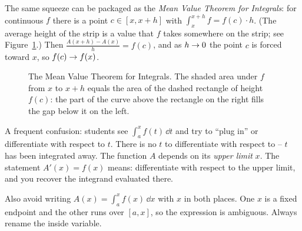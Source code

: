 \begin{remark}
The same squeeze can be packaged as the \emph{Mean Value Theorem for Integrals}:
for continuous $f$ there is a point $c\in[x,x+h]$ with
$\int_x^{x+h} f = f(c)\cdot h$. (The average height of the strip is a value that
$f$ takes somewhere on the strip; see Figure~\ref{ch21:fig-mvt-int}.) Then
$\frac{A(x+h)-A(x)}{h}=f(c)$, and as $h\to 0$ the point $c$ is forced toward $x$,
so $f(c)\to f(x)$.
\end{remark}

\begin{figure}[htbp]
\centering
{}
\caption{The Mean Value Theorem for Integrals. The shaded area under $f$ from $x$
to $x+h$ equals the area of the dashed rectangle of height $f(c)$: the part of the
curve above the rectangle on the right fills the gap below it on the left.}
\label{ch21:fig-mvt-int}
\end{figure}

\begin{trapbox}
A frequent confusion: students see $\int_a^x f(t)\,\dd t$ and try to ``plug in''
or differentiate with respect to $t$. There is no $t$ to differentiate with
respect to -- $t$ has been integrated away. The function $A$ depends on its
\emph{upper limit} $x$. The statement $A'(x)=f(x)$ means: differentiate with
respect to the upper limit, and you recover the integrand evaluated there.

Also avoid writing $A(x)=\int_a^x f(x)\,\dd x$ with $x$ in both places. One $x$
is a fixed endpoint and the other runs over $[a,x]$, so the expression is
ambiguous. Always rename the inside variable.
\end{trapbox}

